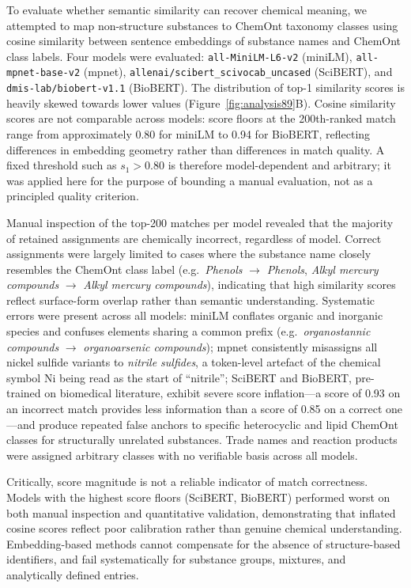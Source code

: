 To evaluate whether semantic similarity can recover chemical meaning, we attempted to map non-structure substances to ChemOnt taxonomy classes using cosine similarity between sentence embeddings of substance names and ChemOnt class labels. Four models were evaluated: \texttt{all-MiniLM-L6-v2} (miniLM), \texttt{all-mpnet-base-v2} (mpnet), \texttt{allenai/scibert\_scivocab\_uncased} (SciBERT), and \texttt{dmis-lab/biobert-v1.1} (BioBERT). The distribution of top-1 similarity scores is heavily skewed towards lower values (Figure~\ref{fig:analysis89}B). Cosine similarity scores are not comparable across models: score floors at the 200th-ranked match range from approximately 0.80 for miniLM to 0.94 for BioBERT, reflecting differences in embedding geometry rather than differences in match quality. A fixed threshold such as $s_1 > 0.80$ is therefore model-dependent and arbitrary; it was applied here for the purpose of bounding a manual evaluation, not as a principled quality criterion.

Manual inspection of the top-200 matches per model revealed that the majority of retained assignments are chemically incorrect, regardless of model. Correct assignments were largely limited to cases where the substance name closely resembles the ChemOnt class label (e.g.\ \textit{Phenols} $\to$ \textit{Phenols}, \textit{Alkyl mercury compounds} $\to$ \textit{Alkyl mercury compounds}), indicating that high similarity scores reflect surface-form overlap rather than semantic understanding. Systematic errors were present across all models: miniLM conflates organic and inorganic species and confuses elements sharing a common prefix (e.g.\ \textit{organostannic compounds} $\to$ \textit{organoarsenic compounds}); mpnet consistently misassigns all nickel sulfide variants to \textit{nitrile sulfides}, a token-level artefact of the chemical symbol Ni being read as the start of ``nitrile''; SciBERT and BioBERT, pre-trained on biomedical literature, exhibit severe score inflation---a score of 0.93 on an incorrect match provides less information than a score of 0.85 on a correct one---and produce repeated false anchors to specific heterocyclic and lipid ChemOnt classes for structurally unrelated substances. Trade names and reaction products were assigned arbitrary classes with no verifiable basis across all models.

Critically, score magnitude is not a reliable indicator of match correctness. Models with the highest score floors (SciBERT, BioBERT) performed worst on both manual inspection and quantitative validation, demonstrating that inflated cosine scores reflect poor calibration rather than genuine chemical understanding. Embedding-based methods cannot compensate for the absence of structure-based identifiers, and fail systematically for substance groups, mixtures, and analytically defined entries.

